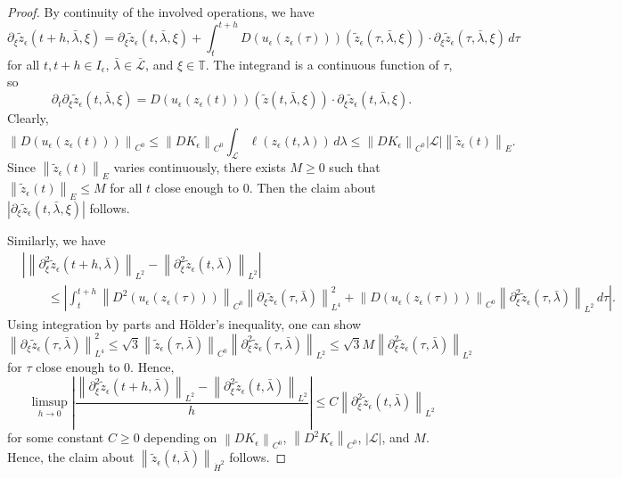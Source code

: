 \documentclass[reqno,centertags,12pt]{amsart}
\theoremstyle{definition}
\numberwithin{equation}{section}
\newcommand{\abs}[1]{\left\lvert#1\right\rvert}
\newcommand{\norm}[1]{\left\|#1\right\|}
\newcommand{\bbT}{{\mathbb{T}}}
\begin{document}
\begin{proof}
    By continuity of the involved operations, we have
    \[
        \partial_{\xi}\tilde{z}_{\epsilon}(t+h,\bar{\lambda},\xi)
        = \partial_{\xi}\tilde{z}_{\epsilon}(t,\bar{\lambda},\xi)
        + \int_{t}^{t+h}D(u_{\epsilon}(z_{\epsilon}(\tau)))
        (\tilde{z}_{\epsilon}(\tau,\bar{\lambda},\xi))
        \cdot\partial_{\xi}\tilde{z}_{\epsilon}(\tau,\bar{\lambda},\xi)\,d\tau
    \]
    for all $t,t+h\in I_{\epsilon}$, $\bar{\lambda}\in\bar{\mathcal{L}}$, and
    $\xi\in\bbT$. The integrand is a continuous function of $\tau$, so
    \[
        \partial_{t}\partial_{\xi}\tilde{z}_{\epsilon}(t,\bar{\lambda},\xi)
        = D(u_{\epsilon}(z_{\epsilon}(t)))
        (\tilde{z}(t,\bar{\lambda},\xi))
        \cdot \partial_{\xi}\tilde{z}_{\epsilon}(t,\bar{\lambda},\xi).
    \]
    Clearly,
    \[
        \norm{D(u_{\epsilon}(z_{\epsilon}(t)))}_{C^{0}}
        \leq \norm{DK_{\epsilon}}_{C^{0}}
        \int_{\mathcal{L}}\ell(z_{\epsilon}(t,\lambda))\,d\lambda
        \leq \norm{DK_{\epsilon}}_{C^{0}}
        \abs{\mathcal{L}}
        \norm{\tilde{z}_{\epsilon}(t)}_{E}.
    \]
    Since $\norm{\tilde{z}_{\epsilon}(t)}_{E}$ varies continuously,
    there exists $M\geq 0$ such that $\norm{\tilde{z}_{\epsilon}(t)}_{E}\leq M$
    for all $t$ close enough to $0$. Then the claim about
    $\abs{\partial_{\xi}\tilde{z}_{\epsilon}(t,\bar{\lambda},\xi)}$ follows.

    Similarly, we have
    \begin{align*}
        &\abs{\norm{\partial_{\xi}^{2}\tilde{z}_{\epsilon}(t+h,\bar{\lambda})}_{L^{2}}
        - \norm{\partial_{\xi}^{2}\tilde{z}_{\epsilon}(t,\bar{\lambda})}_{L^{2}}}
        \\&\quad\quad
        \leq \abs{\int _{t}^{t+h}\norm{D^{2}(u_{\epsilon}(z_{\epsilon}(\tau)))}_{C^{0}}
        \norm{\partial_{\xi}\tilde{z}_{\epsilon}(\tau,\bar{\lambda})}_{L^{4}}^{2}
        + \norm{D(u_{\epsilon}(z_{\epsilon}(\tau)))}_{C^{0}}
        \norm{\partial_{\xi}^{2}\tilde{z}_{\epsilon}(\tau,\bar{\lambda})}_{L^{2}}\,d\tau}.
    \end{align*}
    Using integration by parts and H\"{o}lder's inequality, one can show
    \[
        \norm{\partial_{\xi}\tilde{z}_{\epsilon}(\tau,\bar{\lambda})}_{L^{4}}^{2}
        \leq \sqrt{3}\norm{\tilde{z}_{\epsilon}(\tau,\bar{\lambda})}_{C^{0}}
        \norm{\partial_{\xi}^{2}\tilde{z}_{\epsilon}(\tau,\bar{\lambda})}_{L^{2}}
        \leq \sqrt{3}M\norm{\partial_{\xi}^{2}\tilde{z}_{\epsilon}(\tau,\bar{\lambda})}_{L^{2}}
    \]
    for $\tau$ close enough to $0$. Hence,
    \[
        \limsup_{h\to 0}\abs{
            \frac{\norm{\partial_{\xi}^{2}\tilde{z}_{\epsilon}(t+h,\bar{\lambda})}_{L^{2}}
            - \norm{\partial_{\xi}^{2}\tilde{z}_{\epsilon}(t,\bar{\lambda})}_{L^{2}}}{h}
        }
        \leq C\norm{\partial_{\xi}^{2}\tilde{z}_{\epsilon}(t,\bar{\lambda})}_{L^{2}}
    \]
    for some constant $C\geq 0$ depending on
    $\norm{DK_{\epsilon}}_{C^{0}}$, $\norm{D^{2}K_{\epsilon}}_{C^{0}}$,
    $\abs{\mathcal{L}}$, and $M$. Hence, the claim about
    $\norm{\tilde{z}_{\epsilon}(t,\bar{\lambda})}_{\dot{H}^{2}}$ follows.
\end{proof}
\end{document}
